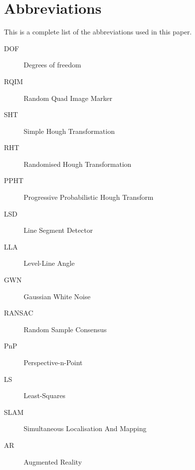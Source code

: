 \chapter*{Abbreviations}
This is a complete list of the abbreviations used in this paper.

\begin{description}
	\item[DOF] Degrees of freedom
	\item[RQIM] Random Quad Image Marker
	\item[SHT] Simple Hough Transformation
	\item[RHT] Randomised Hough Transformation
	\item[PPHT] Progressive Probabilistic Hough Transform
	\item[LSD] Line Segment Detector
	\item[LLA] Level-Line Angle
	\item[GWN] Gaussian White Noise
	\item[RANSAC] Random Sample Consensus
	\item[PnP] Perspective-n-Point
	\item[LS] Least-Squares
	\item[SLAM] Simultaneous Localisation And Mapping
	\item[AR] Augmented Reality
\end{description}